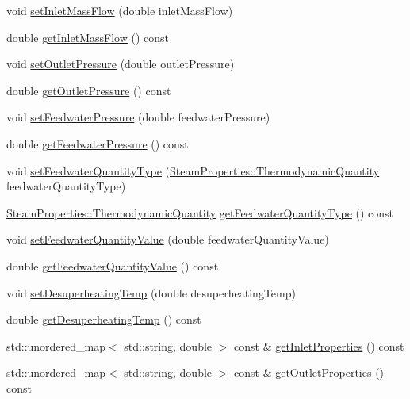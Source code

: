 \begin{DoxyCompactItemize}
void \hyperlink{class_prv_with_desuperheating_a3b018b525bfb4106cc81ac982d9daa9b}{set\+Inlet\+Mass\+Flow} (double inlet\+Mass\+Flow)
\item 
double \hyperlink{class_prv_with_desuperheating_a1befd3ab3853429f69d73f738ac29269}{get\+Inlet\+Mass\+Flow} () const
\item 
void \hyperlink{class_prv_with_desuperheating_ab89d8a884a81d1e3b056433dda988800}{set\+Outlet\+Pressure} (double outlet\+Pressure)
\item 
double \hyperlink{class_prv_with_desuperheating_a33225afd404b54159ed700afba394c03}{get\+Outlet\+Pressure} () const
\item 
void \hyperlink{class_prv_with_desuperheating_a8494ebf87e5bd834f621b0c7ca257fbe}{set\+Feedwater\+Pressure} (double feedwater\+Pressure)
\item 
double \hyperlink{class_prv_with_desuperheating_a260bbe19272694af509fb408a821b041}{get\+Feedwater\+Pressure} () const
\item 
void \hyperlink{class_prv_with_desuperheating_a3efaf028d1e6b8349a9e064605cc8d7a}{set\+Feedwater\+Quantity\+Type} (\hyperlink{class_steam_properties_ae0294bedf7d178c2d8fb6aed0f62fbff}{Steam\+Properties\+::\+Thermodynamic\+Quantity} feedwater\+Quantity\+Type)
\item 
\hyperlink{class_steam_properties_ae0294bedf7d178c2d8fb6aed0f62fbff}{Steam\+Properties\+::\+Thermodynamic\+Quantity} \hyperlink{class_prv_with_desuperheating_aa6901e00ecf819d95f79c20ef1775876}{get\+Feedwater\+Quantity\+Type} () const
\item 
void \hyperlink{class_prv_with_desuperheating_afc17940f7d61898eda1bb4a6f1fea8c3}{set\+Feedwater\+Quantity\+Value} (double feedwater\+Quantity\+Value)
\item 
double \hyperlink{class_prv_with_desuperheating_a8645a251b2e77e434a8bc51dfedcad69}{get\+Feedwater\+Quantity\+Value} () const
\item 
void \hyperlink{class_prv_with_desuperheating_ade1b153c495efb451006b3c054ff386e}{set\+Desuperheating\+Temp} (double desuperheating\+Temp)
\item 
double \hyperlink{class_prv_with_desuperheating_af334a9ff9a14d110cb2851a76d5d84fb}{get\+Desuperheating\+Temp} () const
\item 
std\+::unordered\+\_\+map$<$ std\+::string, double $>$ const  \& \hyperlink{class_prv_with_desuperheating_a62f0d3bb1064d1c59970b9b939cbc35a}{get\+Inlet\+Properties} () const
\item 
std\+::unordered\+\_\+map$<$ std\+::string, double $>$ const  \& \hyperlink{class_prv_with_desuperheating_a870a97f42a06e2236b836d86b9fc64f5}{get\+Outlet\+Properties} () const

\end{DoxyCompactItemize}
